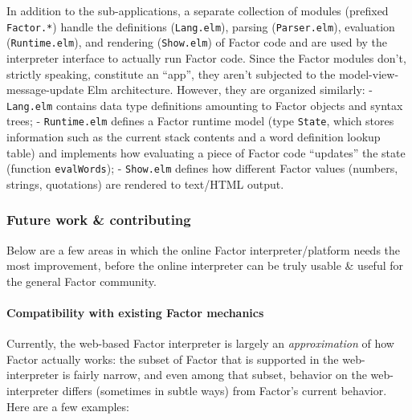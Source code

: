\documentclass[
]{article}
\begin{document}
In addition to the sub-applications, a separate collection of modules
(prefixed \texttt{Factor.*}) handle the definitions (\texttt{Lang.elm}),
parsing (\texttt{Parser.elm}), evaluation (\texttt{Runtime.elm}), and
rendering (\texttt{Show.elm}) of Factor code and are used by the
interpreter interface to actually run Factor code. Since the Factor
modules don't, strictly speaking, constitute an ``app'', they aren't
subjected to the model-view-message-update Elm architecture. However,
they are organized similarly: - \texttt{Lang.elm} contains data type
definitions amounting to Factor objects and syntax trees; -
\texttt{Runtime.elm} defines a Factor runtime model (type
\texttt{State}, which stores information such as the current stack
contents and a word definition lookup table) and implements how
evaluating a piece of Factor code ``updates'' the state (function
\texttt{evalWords}); - \texttt{Show.elm} defines how different Factor
values (numbers, strings, quotations) are rendered to text/HTML output.

\hypertarget{future-work-contributing}{%
\subsubsection{Future work \&
contributing}\label{future-work-contributing}}

Below are a few areas in which the online Factor interpreter/platform
needs the most improvement, before the online interpreter can be truly
usable \& useful for the general Factor community.

\hypertarget{compatibility-with-existing-factor-mechanics}{%
\paragraph{Compatibility with existing Factor
mechanics}\label{compatibility-with-existing-factor-mechanics}}

Currently, the web-based Factor interpreter is largely an
\emph{approximation} of how Factor actually works: the subset of Factor
that is supported in the web-interpreter is fairly narrow, and even
among that subset, behavior on the web-interpreter differs (sometimes in
subtle ways) from Factor's current behavior. Here are a few examples:
\end{document}
